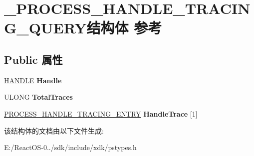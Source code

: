 \hypertarget{struct___p_r_o_c_e_s_s___h_a_n_d_l_e___t_r_a_c_i_n_g___q_u_e_r_y}{}\section{\+\_\+\+P\+R\+O\+C\+E\+S\+S\+\_\+\+H\+A\+N\+D\+L\+E\+\_\+\+T\+R\+A\+C\+I\+N\+G\+\_\+\+Q\+U\+E\+R\+Y结构体 参考}
\label{struct___p_r_o_c_e_s_s___h_a_n_d_l_e___t_r_a_c_i_n_g___q_u_e_r_y}
\subsection*{Public 属性}
\begin{DoxyCompactItemize}
\item 
\mbox{\label{struct___p_r_o_c_e_s_s___h_a_n_d_l_e___t_r_a_c_i_n_g___q_u_e_r_y_a73010f40fd8d211cbd1bcc326ff3d155}} 
\hyperlink{interfacevoid}{H\+A\+N\+D\+LE} {\bfseries Handle}
\item 
\mbox{\label{struct___p_r_o_c_e_s_s___h_a_n_d_l_e___t_r_a_c_i_n_g___q_u_e_r_y_abc56ba81e06a617586ffc56dc33d6c5b}} 
U\+L\+O\+NG {\bfseries Total\+Traces}
\item 
\mbox{\label{struct___p_r_o_c_e_s_s___h_a_n_d_l_e___t_r_a_c_i_n_g___q_u_e_r_y_a62425b34b2165ae86b4c21281bfa874a}} 
\hyperlink{struct___p_r_o_c_e_s_s___h_a_n_d_l_e___t_r_a_c_i_n_g___e_n_t_r_y}{P\+R\+O\+C\+E\+S\+S\+\_\+\+H\+A\+N\+D\+L\+E\+\_\+\+T\+R\+A\+C\+I\+N\+G\+\_\+\+E\+N\+T\+RY} {\bfseries Handle\+Trace} \mbox{[}1\mbox{]}
\end{DoxyCompactItemize}


该结构体的文档由以下文件生成\+:\begin{DoxyCompactItemize}
\item 
E\+:/\+React\+O\+S-\/0../sdk/include/xdk/pstypes.\+h\end{DoxyCompactItemize}
